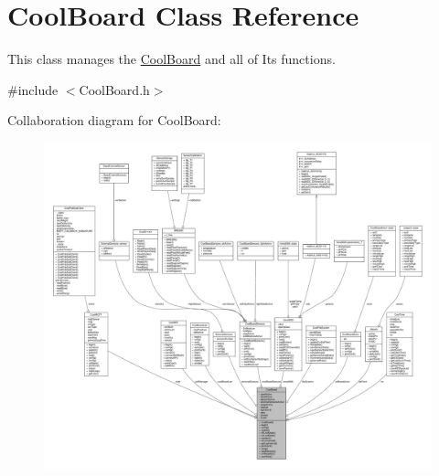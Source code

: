 \hypertarget{class_cool_board}{}\section{Cool\+Board Class Reference}
\label{class_cool_board}


This class manages the \hyperlink{class_cool_board}{Cool\+Board} and all of Its functions.  




{\ttfamily \#include $<$Cool\+Board.\+h$>$}



Collaboration diagram for Cool\+Board\+:
\nopagebreak
\begin{figure}[H]
\begin{center}
\leavevmode
\includegraphics[width=350pt]{d5/d3a/class_cool_board__coll__graph}
\end{center}
\end{figure}
